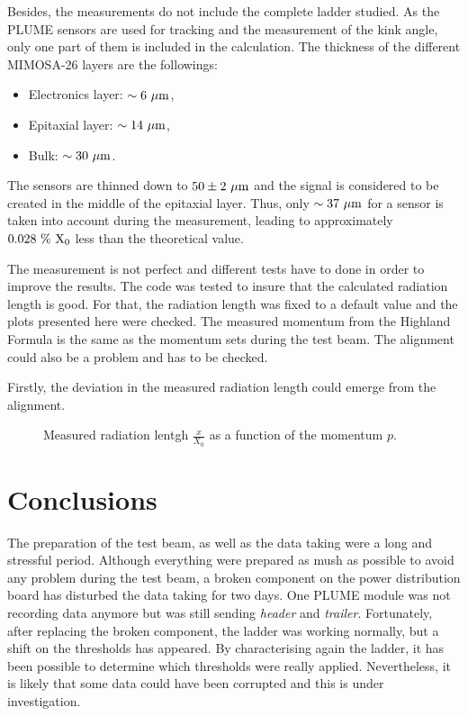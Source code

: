   Besides, the measurements do not include the complete ladder studied. 
   As the \gls{PLUME} sensors are used for tracking and the measurement of the kink angle, only one part of them is included in the calculation.
   The thickness of the different \gls{MIMOSA}-26 layers are the followings: 
   \begin{itemize}
     \item Electronics layer: $\sim 6~\rm{\mu m}$,
     \item Epitaxial layer: $\sim 14~\rm{\mu m}$,
     \item Bulk: $\sim 30~\rm{\mu m}$.
   \end{itemize}
   The sensors are thinned down to $50 \pm 2~\rm{\mu m}$ and the signal is considered to be created in the middle of the epitaxial layer. 
   Thus, only $\sim 37~\rm{\mu m}$ for a sensor is taken into account during the measurement, leading to approximately $0.028~\%~\rm{X_{0}}$ less than the theoretical value.

   The measurement is not perfect and different tests have to done in order to improve the results.
   The code was tested to insure that the calculated radiation length is good.
   For that, the radiation length was fixed to a default value and the plots presented here were checked.
   The measured momentum from the Highland Formula is the same as the momentum sets during the test beam.
   The alignment could also be a problem and has to be checked.

   Firstly, the deviation in the measured radiation length could emerge from the alignment.
  
   \begin{figure}
     \centering
     \caption{Measured radiation lentgh $\frac{x}{X_0}$ as a function of the momentum $p$.}
     \label{fig:X0vsP}
   \end{figure}


  \section{Conclusions}

  The preparation of the test beam, as well as the data taking were a long and stressful period.
  Although everything were prepared as mush as possible to avoid any problem during the test beam, a broken component on the power distribution board has disturbed the data taking for two days.
  One \gls{PLUME} module was not recording data anymore but was still sending \textit{header} and \textit{trailer}.
  Fortunately, after replacing the broken component, the ladder was working normally, but a shift on the thresholds has appeared.
  By characterising again the ladder, it has been possible to determine which thresholds were really applied. 
  Nevertheless, it is likely that some data could have been corrupted and this is under investigation.

